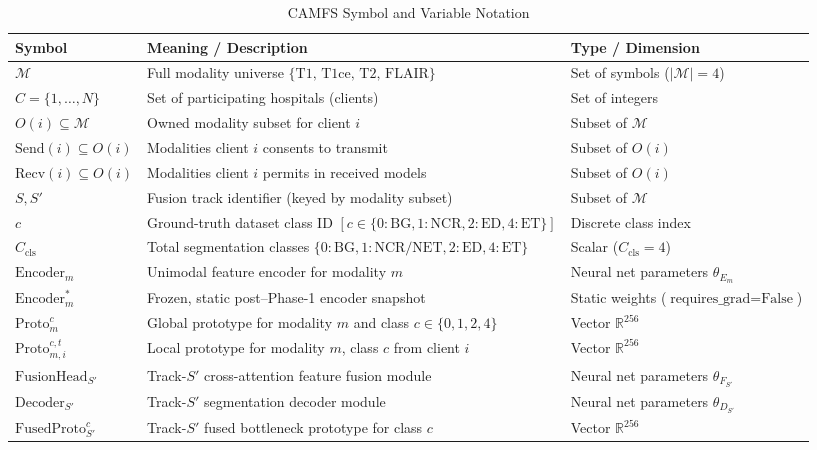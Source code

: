 \documentclass[11pt,a4paper]{article}
\begin{document}
\begin{table}[h!]
\centering
\caption{CAMFS Symbol and Variable Notation}
\label{tab:notation}
\small
\begin{tabular}{@{}llp{5.5cm}@{}}
\toprule
\textbf{Symbol} & \textbf{Meaning / Description} & \textbf{Type / Dimension} \\ \midrule
$\mathcal{M}$ & Full modality universe $\{\text{T1, T1ce, T2, FLAIR}\}$ & Set of symbols ($|\mathcal{M}|=4$) \\
$C = \{1, \dots, N\}$ & Set of participating hospitals (clients) & Set of integers \\
$O(i) \subseteq \mathcal{M}$ & Owned modality subset for client $i$ & Subset of $\mathcal{M}$ \\
$\text{Send}(i) \subseteq O(i)$ & Modalities client $i$ consents to transmit & Subset of $O(i)$ \\
$\text{Recv}(i) \subseteq O(i)$ & Modalities client $i$ permits in received models & Subset of $O(i)$ \\
$S, S'$ & Fusion track identifier (keyed by modality subset) & Subset of $\mathcal{M}$ \\
$c$ & Ground-truth dataset class ID $[c \in \{0:\text{BG}, 1:\text{NCR}, 2:\text{ED}, 4:\text{ET}\}]$ & Discrete class index \\
$C_{\text{cls}}$ & Total segmentation classes $\{0:\text{BG}, 1:\text{NCR/NET}, 2:\text{ED}, 4:\text{ET}\}$ & Scalar ($C_{\text{cls}}=4$) \\
$\text{Encoder}_m$ & Unimodal feature encoder for modality $m$ & Neural net parameters $\theta_{E_m}$ \\
$\text{Encoder}_m^*$ & Frozen, static post--Phase-1 encoder snapshot & Static weights ($\text{requires\_grad}=\text{False}$) \\
$\text{Proto}_m^c$ & Global prototype for modality $m$ and class $c \in \{0,1,2,4\}$ & Vector $\mathbb{R}^{256}$ \\
$\text{Proto}_{m,i}^{c,t}$ & Local prototype for modality $m$, class $c$ from client $i$ & Vector $\mathbb{R}^{256}$ \\
$\text{FusionHead}_{S'}$ & Track-$S'$ cross-attention feature fusion module & Neural net parameters $\theta_{F_{S'}}$ \\
$\text{Decoder}_{S'}$ & Track-$S'$ segmentation decoder module & Neural net parameters $\theta_{D_{S'}}$ \\
$\text{FusedProto}_{S'}^c$ & Track-$S'$ fused bottleneck prototype for class $c$ & Vector $\mathbb{R}^{256}$ \\

\end{tabular}
\end{table}
\end{document}
